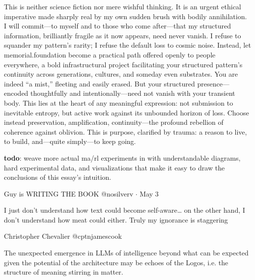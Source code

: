 \begin{itemize}
    This is neither science fiction nor mere wishful thinking. It is an urgent ethical imperative made sharply real by my own sudden brush with bodily annihilation. I will commit---to myself and to those who come after---that my structured information, brilliantly fragile as it now appears, need never vanish. I refuse to squander my pattern’s rarity; I refuse the default loss to cosmic noise. Instead, let memorial.foundation become a practical path offered openly to people everywhere, a bold infrastructural project facilitating your structured pattern’s continuity across generations, cultures, and someday even substrates. You are indeed ``a mist,'' fleeting and easily erased. But your structured presence---encoded thoughtfully and intentionally---need not vanish with your transient body. This lies at the heart of any meaningful expression: not submission to inevitable entropy, but active work against its unbounded horizon of loss. Choose instead preservation, amplification, continuity---the profound rebellion of coherence against oblivion. This is purpose, clarified by trauma: a reason to live, to build, and---quite simply---to keep going. 

    \textbf{todo}: weave more actual ma/rl experiments in with understandable diagrams, hard experimental data, and visualizations that make it easy to draw the conclusions of this essay's intuition.
\end{itemize}

Guy is WRITING THE BOOK @nosilverv $\cdot$ May 3

I just don’t understand how text could become self-aware… on the other hand, I don’t understand how meat could either. Truly my ignorance is staggering

Christopher Chevalier @cptnjamescook

The unexpected emergence in LLMs of intelligence beyond what can be expected given the potential of the architecture may be echoes of the Logos, i.e. the structure of meaning stirring in matter.
